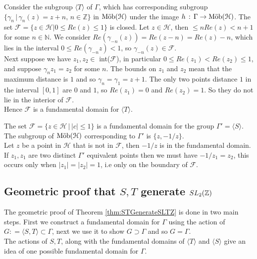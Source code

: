 \begin{example}\label{ex:fundamentalDomainT}
Consider the subgroup $\langle T \rangle$ of $\Gamma$, which has corresponding subgroup $\{\gamma_n \, \vert \, \gamma_n(z) = z+n, \, n \in \mathbb{Z}\}$ in $\text{M{\"o}b}(\mathcal{H})$ under the image $h \, : \, \Gamma \rightarrow \text{M{\"o}b}(\mathcal{H})$. The set $\mathcal{F} = \{ z \in \mathcal{H} \vert 0 \leq Re(z) \leq 1 \}$ is closed. Let $z \in \mathcal{H}$, then $ \leq n Re(z) < n+1$ for some $n \in \mathbb{N}$. We consider $Re(\gamma_{-n}(z)) = Re(z - n) = Re(z) - n$, which lies in the interval $ 0 \leq Re(\gamma_{-n}z) < 1$, so $\gamma_{-n}(z) \in \mathcal{F}$. \\
Next suppose we have $z_1, z_2 \in$ int($\mathcal{F}$), in particular $ 0 \leq Re(z_1) < Re(z_2) \leq 1$, and suppose $\gamma_n z_1 = z_2$ for some $n$. The bounds on $z_1$ and $z_2$ mean that the maximum distance is $1$ and so $\gamma_n = \gamma_1 = z + 1$. The only two points distance $1$ in the interval $[0,1]$ are $0$ and $1$, so $Re(z_1) = 0$ and $Re(z_2) = 1$. So they do not lie in the interior of $\mathcal{F}$. \\
Hence $\mathcal{F}$ is a fundamental domain for $\langle T \rangle$. 



\end{example}

\begin{example}\label{ex:fundamentalDomainS}
The set $\mathcal{F} = \{z \in \mathcal{H} \, \vert \, \vert c \vert \leq 1\}$ is a fundamental domain for the group $\Gamma' = \langle S \rangle$. The subgroup of $\text{M{\"o}b}(\mathcal{H})$ corresponding to $\Gamma'$ is $\{z, -1/z\}$.\\
Let $z$ be a point in $\mathcal{H}$ that is not in $\mathcal{F}$, then $-1/z$ is in the fundamental domain. \\
If $z_1, z_1$ are two distinct $\Gamma'$ equivalent points then we must have $-1/z_1 = z_2$, this occurs only when $\vert z_1 \vert = \vert z_2 \vert = 1$, i.e only on the boundary of $\mathcal{F}$.
\end{example}


\subsection{Geometric proof that $S,T$ generate $SL_2(\mathbb{Z})$}

The geometric proof of Theorem \ref{thm:STGenerateSLTZ} is done in two main steps. First we construct a fundamental domain for $\Gamma$ using the action of $G: = \langle S, T \rangle \subset \Gamma$, next we use it to show $G \supset \Gamma$ and so $G = \Gamma$. 
\\ 
The actions of $S, T$, along with the fundamental domains of $\langle T \rangle$ and $\langle S \rangle$ give an idea of one possible fundamental domain for $\Gamma$.

